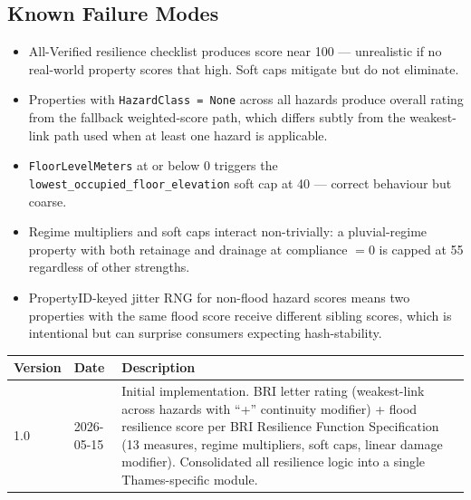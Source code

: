 \documentclass[11pt,a4paper]{article}
\begin{document}
\subsection{Known Failure Modes}
\begin{itemize}[nosep]
    \item All-Verified resilience checklist produces score near 100 --- unrealistic if
          no real-world property scores that high. Soft caps mitigate but do not
          eliminate.
    \item Properties with \texttt{HazardClass = None} across all hazards produce
          overall rating from the fallback weighted-score path, which differs subtly
          from the weakest-link path used when at least one hazard is applicable.
    \item \texttt{FloorLevelMeters} at or below 0 triggers the
          \texttt{lowest\_occupied\_floor\_elevation} soft cap at 40 --- correct
          behaviour but coarse.
    \item Regime multipliers and soft caps interact non-trivially: a pluvial-regime
          property with both retainage and drainage at compliance $= 0$ is capped at
          55 regardless of other strengths.
    \item PropertyID-keyed jitter RNG for non-flood hazard scores means two
          properties with the same flood score receive different sibling scores,
          which is intentional but can surprise consumers expecting hash-stability.
\end{itemize}

\mkmchangelog

\begin{center}
\begin{tabular}{lll}
    \toprule
    \textbf{Version} & \textbf{Date} & \textbf{Description} \\
    \midrule
    1.0 & 2026-05-15 & Initial implementation. BRI letter rating
                       (weakest-link across hazards with ``+'' continuity modifier)
                       + flood resilience score per BRI Resilience Function
                       Specification (13 measures, regime multipliers, soft caps,
                       linear damage modifier). Consolidated all resilience logic
                       into a single Thames-specific module. \\
    \bottomrule
\end{tabular}
\end{center}
\end{document}
